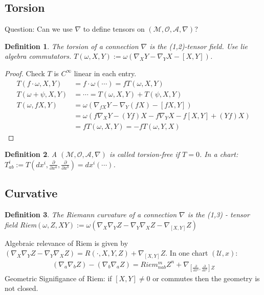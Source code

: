 \documentclass[10pt, oneside]{article}
\newcommand{\M}{\mathcal{M}}
\newtheorem{defn}{Definition}
\begin{document}
   \subsection{Torsion}
   Question: Can we use $\nabla$ to define tensors on $(\M,\mathcal{O},\mathcal{A},\nabla)$?
   \begin{defn}
   The torsion of a connection $\nabla$ is the (1,2)-tensor field. Use lie algebra commutators. $T(\omega,X,Y):= \omega(\nabla_X Y - \nabla_Y X - [X,Y])$.
   \end{defn}   
   \begin{proof}
      Check $T$ is $C^\infty$ linear in each entry. 
      \begin{align*}
         T(f \cdot \omega,X,Y)&= f \cdot \omega (\cdots)= f T(\omega,X,Y) \\
         T(\omega+\psi, X,Y) &= \cdots = T(\omega,X,Y)+T(\psi,X,Y) \\
         T(\omega,f X,Y) &= \omega(\nabla_{fX} Y - \nabla_Y (f X) - [fX,Y]) \\
         &= \omega(f \nabla_X Y - (Y f) X - f \nabla_Y X - f[X,Y] + (Y f) X) \\
         &= f T(\omega,X,Y) = - f T(\omega,Y,X)
      \end{align*}
   \end{proof}
   \begin{defn}
   A $(\M,\mathcal{O},\mathcal{A},\nabla)$ is called torsion-free if $T=0$. In a chart: $T^i_{ab} := T(dx^i,\frac{\partial}{\partial x^a},\frac{\partial}{\partial x^b}) = dx^i (\cdots)$.
   \end{defn}
   \subsection{Curvative}
   \begin{defn}
   The Riemann curvature of a connection $\nabla$ is the (1,3) - tensor field Riem$(\omega,Z,XY):= \omega(\nabla_X \nabla_Y Z - \nabla_Y \nabla_X Z - \nabla_{[X,Y]}Z)$
   \end{defn}
   Algebraic relevance of Riem is given by $(\nabla_X \nabla_Y Z - \nabla_Y \nabla_X Z) = R(\cdot,X,Y,Z)+\nabla_{[X,Y]} Z$. In one chart $(\mathcal{U},x)$:
   \begin{align*}
      (\nabla_a \nabla_b Z) - (\nabla_b \nabla_a Z) = Riem^m_{n ab} Z^n + \nabla_{[\frac{\partial}{\partial x^a},\frac{\partial}{\partial x^b}]Z}
   \end{align*}
   Geometric Signifigance of Riem: if $[X,Y] \not = 0$ or commutes then the geometry is not closed. 
\end{document}
